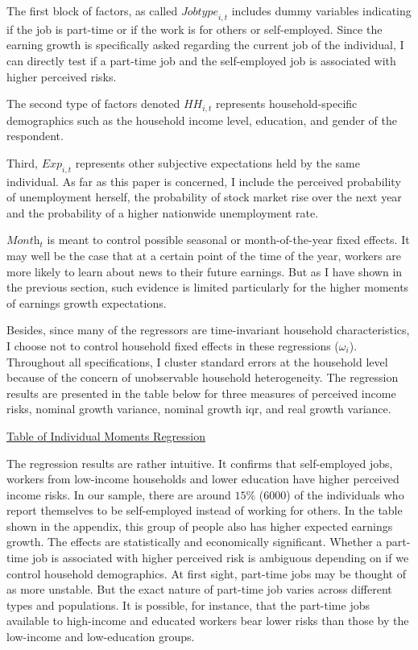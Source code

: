 \documentclass[12pt,notitlepage,onecolumn,aps,pra]{revtex4-1}
\begin{document}
The first block of factors, as called \(\textit{Jobtype}_{i,t}\)
includes dummy variables indicating if the job is part-time or if the
work is for others or self-employed. Since the earning growth is
specifically asked regarding the current job of the individual, I can
directly test if a part-time job and the self-employed job is associated
with higher perceived risks.

The second type of factors denoted \(\textit{HH}_{i,t}\) represents
household-specific demographics such as the household income level,
education, and gender of the respondent.

Third, \(\textit{Exp}_{i,t}\) represents other subjective expectations
held by the same individual. As far as this paper is concerned, I
include the perceived probability of unemployment herself, the
probability of stock market rise over the next year and the probability
of a higher nationwide unemployment rate.

\(\textit{Month}_t\) is meant to control possible seasonal or
month-of-the-year fixed effects. It may well be the case that at a
certain point of the time of the year, workers are more likely to learn
about news to their future earnings. But as I have shown in the previous
section, such evidence is limited particularly for the higher moments of
earnings growth expectations.

Besides, since many of the regressors are time-invariant household
characteristics, I choose not to control household fixed effects in
these regressions (\(\omega_i\)). Throughout all specifications, I
cluster standard errors at the household level because of the concern of
unobservable household heterogeneity. The regression results are
presented in the table below for three measures of perceived income
risks, nominal growth variance, nominal growth iqr, and real growth
variance.

\href{../Table/mom_ind_reg.cvs}{Table of Individual Moments Regression}

The regression results are rather intuitive. It confirms that
self-employed jobs, workers from low-income households and lower
education have higher perceived income risks. In our sample, there are
around \(15\%\) (6000) of the individuals who report themselves to be
self-employed instead of working for others. In the table shown in the
appendix, this group of people also has higher expected earnings growth.
The effects are statistically and economically significant. Whether a
part-time job is associated with higher perceived risk is ambiguous
depending on if we control household demographics. At first sight,
part-time jobs may be thought of as more unstable. But the exact nature
of part-time job varies across different types and populations. It is
possible, for instance, that the part-time jobs available to high-income
and educated workers bear lower risks than those by the low-income and
low-education groups.
\end{document}
